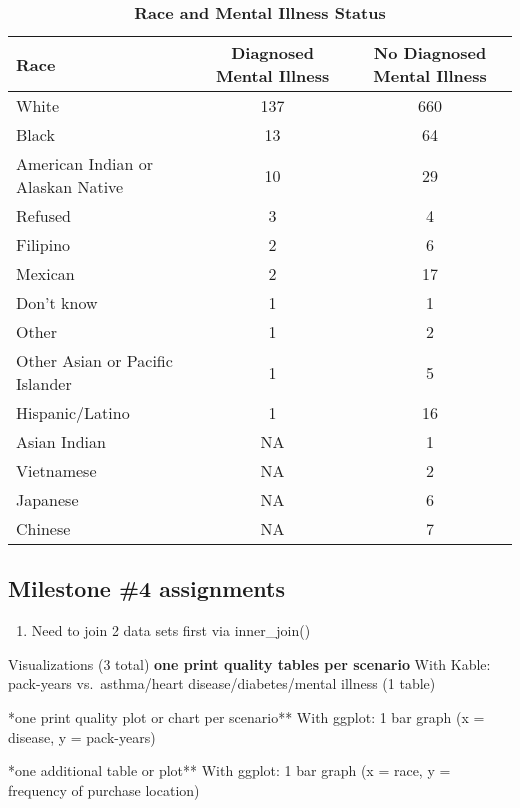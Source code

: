 \documentclass[
]{article}
\providecommand{\tightlist}{%
  \setlength{\itemsep}{0pt}\setlength{\parskip}{0pt}}
\begin{document}
\begin{table}[H]

\caption{\label{tab:importing data for reference}\textbf{Race and Mental Illness Status}}
\centering
\begin{tabular}[t]{lcc}
\toprule
Race & Diagnosed Mental Illness & No Diagnosed Mental Illness\\
\midrule
White & 137 & 660\\
Black & 13 & 64\\
American Indian or Alaskan Native & 10 & 29\\
Refused & 3 & 4\\
Filipino & 2 & 6\\
\addlinespace
Mexican & 2 & 17\\
Don't know & 1 & 1\\
Other & 1 & 2\\
Other Asian or Pacific Islander & 1 & 5\\
Hispanic/Latino & 1 & 16\\
\addlinespace
Asian Indian & NA & 1\\
Vietnamese & NA & 2\\
Japanese & NA & 6\\
Chinese & NA & 7\\
\bottomrule
\end{tabular}
\end{table}

\newpage

\hypertarget{milestone-4-assignments}{%
\subsection{Milestone \#4 assignments}\label{milestone-4-assignments}}

\begin{enumerate}
\def\labelenumi{\arabic{enumi})}
\tightlist
\item
  Need to join 2 data sets first via inner\_join()
\end{enumerate}

Visualizations (3 total) \textbf{one print quality tables per scenario}
With Kable: pack-years vs.~asthma/heart disease/diabetes/mental illness
(1 table)

\newline **one print quality plot or chart per scenario** With ggplot: 1
bar graph (x = disease, y = pack-years)

\newline **one additional table or plot** With ggplot: 1 bar graph (x =
race, y = frequency of purchase location)
\end{document}
